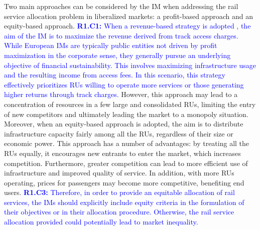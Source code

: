 \documentclass[preprint,12pt]{elsarticle}
\begin{document}
Two main approaches can be considered by the \gls{IM} when addressing the rail service allocation problem in liberalized markets: a profit-based approach and an equity-based approach. \textcolor{blue}{\textbf{R1.C1:} When a revenue-based strategy is adopted \cite{DavidMunoz-Valero2025AnAlgorithms}, the aim of the \gls{IM} is to maximize the revenue derived from track access charges. While European \glspl{IM} are typically public entities not driven by profit maximization in the corporate sense, they generally pursue an underlying objective of financial sustainability. This involves maximizing infrastructure usage and the resulting income from access fees. In this scenario, this strategy effectively prioritizes \glspl{RU} willing to operate more services or those generating higher returns through track charges.} However, this approach may lead to a concentration of resources in a few large and consolidated \glspl{RU}, limiting the entry of new competitors and ultimately leading the market to a monopoly situation. Moreover, when an equity-based approach \cite{Shao2022Equity-orientedSystem} is adopted, the aim is to distribute infrastructure capacity fairly among all the \glspl{RU}, regardless of their size or economic power. This approach has a number of advantages: by treating all the \glspl{RU} equally, it encourages new entrants to enter the market, which increases competition. Furthermore, greater competition can lead to more efficient use of infrastructure and improved quality of service. In addition, with more \glspl{RU} operating, prices for passengers may become more competitive, benefiting end users. \textcolor{blue} {\textbf{R1.C3:} Therefore, in order to provide an equitable allocation of rail services, the \glspl{IM} should explicitly include equity criteria in the formulation of their objectives or in their allocation procedure. Otherwise, the rail service allocation provided could potentially lead to market inequality.}
\end{document}
